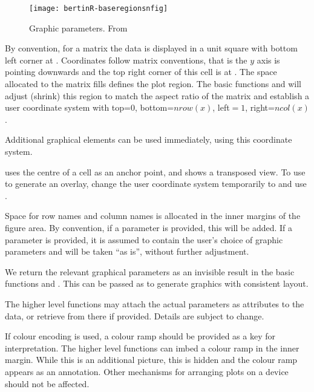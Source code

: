 \documentclass[nogin, dvips,12pt,a4paper,twoside]{amsart}
\begin{document}
%
\begin{figure}[htbp]
\begin{center}
\texttt{[image: bertinR-baseregionsnfig]}
\caption{Graphic parameters.  From \cite{Murrell2011R-Graphics}}
\label{fig:baseregionsnfig}
\end{center}
\end{figure}
%

By convention, for a matrix   the data  is displayed in a unit square with bottom left corner at .
Coordinates follow matrix conventions,  that is the $y$ axis is pointing downwards and the top right corner of this cell is at . The space allocated to the matrix fills defines the plot region.  The basic  functions  and  will adjust (shrink) this region to match the aspect ratio of the matrix and establish a user coordinate system with top=$0$, bottom=$nrow(x)$, left$=1$, right=$ncol(x)$.

Additional graphical elements can be used immediately, using this coordinate system.

 uses the centre of a cell as an anchor point, and shows a transposed view. To use  to generate an overlay, change the user coordinate system temporarily to  and use .

Space for row names and column names is allocated in the inner margins of the figure area. By convention, if a parameter  is provided, this will be added. If a parameter  is provided, it is assumed to contain the user's choice of graphic parameters and will be taken ``as is'', without further adjustment.

We return the relevant graphical parameters as an invisible result in the basic  functions  and . This can be passed as   to generate graphics with consistent layout. 

The higher level functions may attach the actual parameters as attributes to the data, or retrieve from there if provided. Details are subject to change.

If colour encoding is used, a colour ramp should be provided as a key for interpretation. The higher level functions can imbed a colour ramp in the inner margin. While this is an additional picture, this is hidden and the colour ramp appears as an annotation.  Other mechanisms for arranging plots on a device should not be affected.
\end{document}
